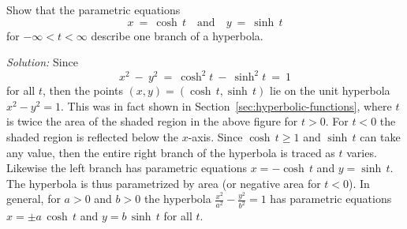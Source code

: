 \begin{exmp}\label{exmp:paramhyperbola}
\noindent Show that the parametric equations
\[
x ~=~ \cosh\,t \quad\text{and}\quad y ~=~ \sinh\,t
\]
for $-\infty < t < \infty$ describe one branch of a hyperbola.\vspace{1mm}
\par\noindent\emph{Solution:} Since
\[
x^2 ~-~ y^2 ~=~ \cosh^2 t ~-~ \sinh^2 t ~=~ 1
\]
for all $t$, then the points $(x,y) = (\cosh\,t,\sinh\,t)$ lie on the unit
hyperbola $x^2-y^2=1$. This was in fact shown in Section~\ref{sec:hyperbolic-functions}, where $t$ is twice
the area of the shaded region in the above figure for $t>0$. For $t<0$ the
shaded region is reflected below the $x$-axis. Since $\cosh\,t \ge 1$ and
$\sinh\,t$ can take any value, then the entire right branch of the hyperbola is
traced as $t$ varies. Likewise the left branch has parametric equations
$x=-\cosh\,t$ and $y=\sinh\,t$. The hyperbola is thus parametrized by area (or
negative area for $t <0$). In general, for $a>0$ and $b>0$ the hyperbola
$\frac{x^2}{a^2}-\frac{y^2}{b^2}=1$ has parametric equations
$x=\pm a\,\cosh\,t$ and $y=b\,\sinh\,t$ for all $t$.
\end{exmp}
\divider
\newpage
